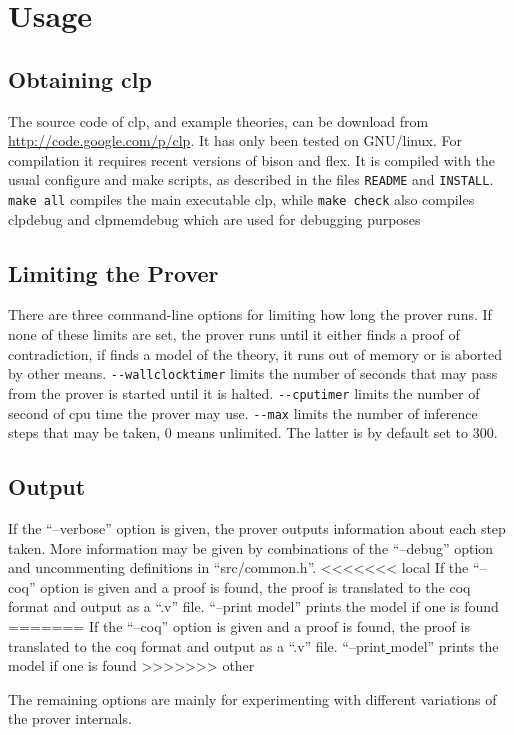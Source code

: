 \documentclass[a4paper]{article}
\begin{document}
\section{Usage}
\subsection{Obtaining clp}
The source code of clp, and example theories, can be download from \url{http://code.google.com/p/clp}. It has only been tested on GNU/linux. For compilation it requires recent versions of bison and flex. It is compiled with the usual configure and make scripts, as described in the files \verb|README| and \verb|INSTALL|. \verb|make all| compiles the main executable clp, while \verb|make check| also compiles clpdebug and clpmemdebug which are used for debugging purposes


\subsection{Limiting the Prover}
There are three command-line options for limiting how long the prover runs. If none of these limits are set, the prover runs until it either finds a proof of contradiction, if finds a model of the theory, it runs out of memory or is aborted by other means. \verb|--wallclocktimer| limits the number of seconds that may pass from the prover is started until it is halted. \verb|--cputimer| limits the number of second of cpu time the prover may use. \verb|--max| limits the number of inference steps that may be taken, $0$ means unlimited. The latter is by default set to $300$.

\subsection{Output}
If the ``--verbose'' option is given, the prover outputs information about each step taken. More information may be given by combinations of the ``--debug'' option and uncommenting definitions in ``src/common.h''. 
<<<<<<< local
If the ``--coq'' option is given and a proof is found, the proof is translated to the coq format and output as a ``.v'' file. ``--print model'' prints the model if one is found
=======
If the ``--coq'' option is given and a proof is found, the proof is translated to the coq format and output as a ``.v'' file. ``--print\underline{ }model'' prints the model if one is found
>>>>>>> other

The remaining options are mainly for experimenting with different variations of the prover internals. 
\end{document}
